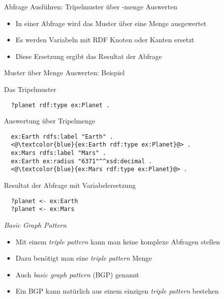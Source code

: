 \documentclass{beamer}
\begin{document}
\begin{frame}{Abfrage Ausführen: Tripelmuster über -menge Auswerten}
	
	\begin{itemize}
		\item In einer Abfrage wird das Muster über eine Menge ausgewertet
		\item Es werden Variabeln mit RDF Knoten oder Kanten ersetzt
		\item Diese Ersetzung ergibt das Resultat der Abfrage
	\end{itemize}
	
\end{frame}

\begin{frame}[fragile]{Muster über Menge Auswerten: Beispiel}
	
	Das Tripelmuster
	\vspace{0.1cm}\small
	\begin{lstlisting}		
  ?planet rdf:type ex:Planet .
    \end{lstlisting}
   	\vspace{0.3cm}\normalsize
    Auswertung über Tripelmenge
   	\vspace{0.1cm}\small
	\begin{lstlisting}
  ex:Earth rdfs:label "Earth" .
  <@\textcolor{blue}{ex:Earth rdf:type ex:Planet}@> .
  ex:Mars rdfs:label "Mars" .
  ex:Earth ex:radius "6371"^^xsd:decimal .
  <@\textcolor{blue}{ex:Mars rdf:type ex:Planet}@> .
    \end{lstlisting}
   	\vspace{0.3cm}\normalsize
    Resultat der Abfrage mit Variabelersetzung
   	\vspace{0.1cm}\small
	\begin{lstlisting}
  ?planet <- ex:Earth
  ?planet <- ex:Mars
	\end{lstlisting}
\end{frame}

\begin{frame}{\emph{Basic Graph Pattern}}
	
	\begin{itemize}
		\item Mit einem \emph{triple pattern} kann man keine komplexe Abfragen stellen
		\item Dazu benötigt man eine \emph{triple pattern} Menge
		\item Auch \emph{basic graph pattern} (BGP) genannt
		\item Ein BGP kann natürlich aus einem einzigen \emph{triple pattern} bestehen
	\end{itemize}
	
\end{frame}
\end{document}
